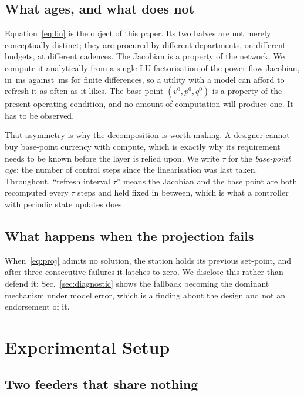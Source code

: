 \documentclass[conference,a4paper]{IEEEtran}
\begin{document}
\subsection{What ages, and what does not}
\label{sec:twohalves}

Equation~\eqref{eq:lin} is the object of this paper. Its two halves are not
merely conceptually distinct; they are procured by different departments, on
different budgets, at different cadences. The Jacobian is a property of the
network. We compute it analytically from a single LU factorisation of the
power-flow Jacobian, in \nSensFast\,ms against \nSensSlow\,ms for finite
differences, so a utility with a model can afford to refresh it as often as it
likes. The base point $(v^{0}, p^{0}, q^{0})$ is a property of the present
operating condition, and no amount of computation will produce one. It has to be
observed.

That asymmetry is why the decomposition is worth making. A designer cannot buy
base-point currency with compute, which is exactly why its requirement needs to
be known before the layer is relied upon. We write $\tau$ for the \emph{base-point
age}: the number of control steps since the linearisation was last taken.
Throughout, ``refresh interval $\tau$'' means the Jacobian and the base point are
both recomputed every $\tau$ steps and held fixed in between, which is what a
controller with periodic state updates does.

\subsection{What happens when the projection fails}

When~\eqref{eq:proj} admits no solution, the station holds its previous
set-point, and after three consecutive failures it latches to zero. We disclose
this rather than defend it: Sec.~\ref{sec:diagnostic} shows the fallback becoming
the dominant mechanism under model error, which is a finding about the design and
not an endorsement of it.

\section{Experimental Setup}

\subsection{Two feeders that share nothing}
\end{document}
